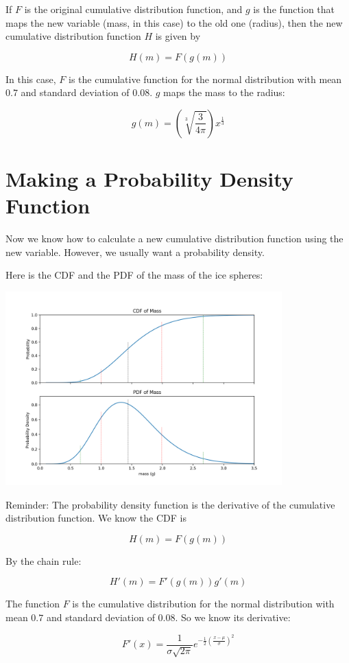 If $F$ is the original cumulative distribution function, and $g$ is the function that maps the new variable (mass, in this case) to the old one (radius),  then the 
new cumulative distribution function $H$ is given by 

$$H(m) = F(g(m))$$

In this case,   $F$ is the cumulative function for the normal distribution with mean $0.7$ and standard deviation of $0.08$.  $g$ maps the mass to the radius:

$$g(m) =\left(\sqrt[3]{\frac{3}{4 \pi}}\right) x^{\frac{1}{3}}$$

\section{Making a Probability Density Function}

Now we know how to calculate a new cumulative distribution function using the new variable.  However,  we usually want a probability density.

Here is the CDF and the PDF of the mass of the ice spheres:

\includegraphics[width=0.8\textwidth]{pdf.png}

Reminder: The probability density function is the derivative of the cumulative distribution function.    We know the CDF is

$$H(m) = F(g(m))$$

By the chain rule:

$$H'(m) = F'(g(m))g'(m)$$

The function $F$ is the cumulative distribution for the normal distribution with mean $0.7$ and standard deviation of $0.08$.  So we know its derivative:

$$F'(x) = \frac{1}{\sigma\sqrt{2\pi}} e^{-\frac{1}{2}\left(\frac{x - \mu}{\sigma}\right)^2}$$

